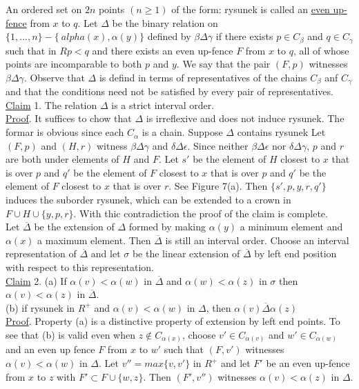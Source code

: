 \documentclass[twoside]{article}
\begin{document}
An ordered set on $2n$ points $(n\geq 1)$ of the form: rysunek is called an \underline {even up-fence}
from $x$ to $q$. Let $\Delta$ be the binary relation on $\{1,...,n\} - \{\ alpha (x), \alpha (y)\}$
defined by $\beta \Delta \gamma$ if there exists $p \in C_{\beta}$ and $q \in C_{\gamma}$
such that in $R p<q$ and there exists an even up-fence $F$ from $x$ to $q$, all of whose points
are incomparable to both $p$ and $y$. We say that the pair $(F,p)$ witnesses $\beta \Delta \gamma$.
Observe that $\Delta$ is defind in terms of representatives of the chains $C_{\beta}$ anf $C_{\gamma}$
and that the conditions need not be satisfied by every pair of representatives.\\
%
%
\newline
\underline{Claim} 1. The relation $\Delta$ is a strict interval order.\\
\newline
\underline{Proof}. It suffices to chow that $\Delta$ is irreflexive and does not induce rysunek.
The formar is obvious since each $C_{\alpha}$ is a chain. Suppose $\Delta$ contains rysunek
Let $(F,p)$ and $(H,r)$ witness $\beta \Delta \gamma$ and $\delta \Delta \epsilon$. Since neither
$\beta \Delta \epsilon$ nor $\delta \Delta \gamma$, $p$ and $r$ are both under elements of $H$
and $F$. Let $s'$ be the element of $H$ closest to $x$ that is over $p$ and $q'$ be the element of $F$
closest to $x$ that is over $p$ and $q'$ be the element of $F$ closest to $x$ that is over $r$. See
Figure 7(a). Then $\{s',p,y,r,q'\}$ induces the suborder rysunek, which can be extended to a crown in
$F \cup H \cup \{y,p,r\}$. With thic contradiction the proof of the claim is complete.\\

Let $\overline{\Delta}$ be the extension of $\Delta$ formed by making $\alpha (y)$ a minimum element
and $\alpha (x)$ a maximum element. Then $\overline{\Delta}$ is still an interval order. Choose an interval
representation of $\overline{\Delta}$ and let $\sigma$ be the linear extension of $\overline{\Delta}$
by left end position with respect to this representation.\\
\newline
\underline{Claim} 2. (a) If $\alpha (v) < \alpha (w)$ in $\overline{\Delta}$ and 
$\alpha (w) < \alpha (z)$ in $\sigma$ then $\alpha (v) < \alpha (z)$ in $\overline{\Delta}$.\\
(b) if rysunek in $R^+$ and $\alpha (v) < \alpha (w)$ in $\Delta$, then $\alpha (v) \overline {\Delta} \alpha (z)$\\
\newline
\underline {Proof}. Property (a) is a distinctive property of extension by left end points. To see that (b) is valid even when 
$z \not\in C_{\alpha (x)}$, choose $v' \in C_{\alpha (v)}$ and $w' \in C_{\alpha (w)}$
and an even up fence $F$ from $x$ to $w'$ such that $(F,v')$ witnesses $\alpha (v) < \alpha (w)$
in $\Delta$. Let $v'' = max\{v,v'\}$ in $R^+$ and let $F'$ be an even up-fence from $x$ to $z$
with $F' \subset F \cup \{w,z\}$. Then $(F',v'')$ witnesses $\alpha (v) < \alpha (z)$ in $\Delta$.\\
\end{document}
